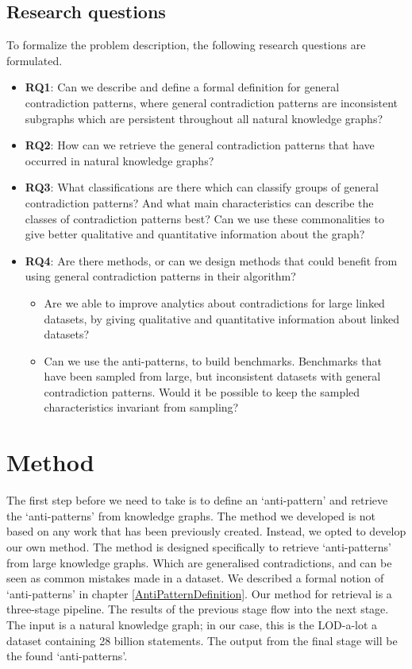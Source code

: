 \documentclass[11pt,letterpaper ,oneside ]{book}
\begin{document}
	\subsection{Research questions}
	To formalize the problem description, the following research questions are formulated.
	\begin{itemize}
		\item \textbf{RQ1}: Can we describe and define a formal definition for general contradiction patterns, where general contradiction patterns are inconsistent subgraphs which are persistent throughout all natural knowledge graphs?
		\item \textbf{RQ2}: How can we retrieve the general contradiction patterns that have occurred in natural knowledge graphs? 
		\item \textbf{RQ3}: What classifications are there which can classify groups of general contradiction patterns? And what main characteristics can describe the classes of contradiction patterns best? Can we use these commonalities to give better qualitative and quantitative information about the graph?
		\item \textbf{RQ4}: Are there methods, or can we design methods that could benefit from using general contradiction patterns in their algorithm? 
		\begin{itemize}
			\item Are we able to improve analytics about contradictions for large linked datasets, by giving qualitative and quantitative information about linked datasets?
			\item Can we use the anti-patterns, to build benchmarks. Benchmarks that have been sampled from large, but inconsistent datasets with general contradiction patterns. Would it be possible to keep the sampled characteristics invariant from sampling?
		\end{itemize}
	\end{itemize}
	
	\section{Method}
	The first step before we need to take is to define an `anti-pattern' and retrieve the `anti-patterns' from knowledge graphs. The method we developed is not based on any work that has been previously created. Instead, we opted to develop our own method. The method is designed specifically to retrieve `anti-patterns' from large knowledge graphs. Which are generalised contradictions, and can be seen as common mistakes made in a dataset. We described a formal notion of `anti-patterns' in chapter \ref{AntiPatternDefinition}. Our method for retrieval is a three-stage pipeline. The results of the previous stage flow into the next stage. The input is a natural knowledge graph; in our case, this is the LOD-a-lot\cite{JavierD:2017} a dataset containing 28 billion statements. The output from the final stage will be the found `anti-patterns'. 
	
\end{document}
